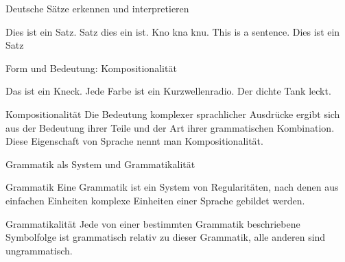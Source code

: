 \begin{frame}
  {Deutsche Sätze erkennen und interpretieren}
  \pause
  \begin{exe}
    \ex Dies ist ein Satz.
  \pause
    \ex Satz dies ein ist.
  \pause
    \ex Kno kna knu.
  \pause
    \ex This is a sentence.
  \pause
    \vspace{\baselineskip}
    \ex Dies ist ein Satz
  \end{exe}
\end{frame}


\begin{frame}
  {Form und Bedeutung: Kompositionalität}
  \begin{exe}
    \ex Das ist ein Kneck.
    \pause
    \vspace{\baselineskip}
  \ex Jede Farbe ist ein Kurzwellenradio.
  \ex Der dichte Tank leckt.
\end{exe}
    \vspace{\baselineskip}
  \pause

  \Large\begin{block}{Kompositionalität}
    Die Bedeutung komplexer sprachlicher Ausdrücke ergibt sich aus der Bedeutung ihrer Teile und der Art ihrer grammatischen Kombination. 
    Diese Eigenschaft von Sprache nennt man Kompositionalität.
  \end{block}
\end{frame}

\begin{frame}
  {Grammatik als System und Grammatikalität}
  \pause

  \Large\begin{block}{Grammatik}
    Eine Grammatik ist ein \alert{System von Regularitäten}, nach denen aus einfachen Einheiten komplexe Einheiten einer Sprache gebildet werden.
  \end{block}
  \vspace{\baselineskip}

  \pause

  \begin{block}{Grammatikalität}
    Jede von einer bestimmten Grammatik beschriebene Symbolfolge ist \alert{grammatisch} relativ zu dieser Grammatik, alle anderen sind \alert{ungrammatisch}.
  \end{block}
\end{frame}

